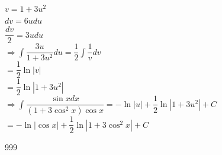 \documentclass[a4paper]{article}
\begin{document}
$v = 1 + 3u^2$\\

$dv = 6u du$\\

$\dfrac{dv}{2} = 3u du$\\

$\Rightarrow \displaystyle\int \dfrac{3u}{1 + 3u^2}du = \dfrac{1}{2}\displaystyle\int \dfrac{1}{v}dv$\\

$= \dfrac{1}{2}\ln |v|$\\

$= \dfrac{1}{2}\ln |1 + 3u^2|$\\

$\Rightarrow \displaystyle\int \dfrac{\sin x dx}{(1 + 3\cos^2 x)\cos x} = - \ln |u| + \dfrac{1}{2} \ln |1 + 3u^2| + C$\\

$= - \ln |\cos x| + \dfrac{1}{2} \ln |1 + 3\cos^2 x| + C$\\

















\begin{thebibliography}{999}
\end{thebibliography}
\end{document}
